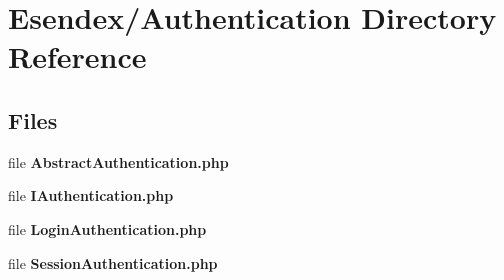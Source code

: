 \section{Esendex/\-Authentication Directory Reference}
\label{dir_8fef57e3d450ae2bdbdd65d9e7bc4335}
\subsection*{Files}
\begin{DoxyCompactItemize}
\item 
file {\bfseries Abstract\-Authentication.\-php}
\item 
file {\bfseries I\-Authentication.\-php}
\item 
file {\bfseries Login\-Authentication.\-php}
\item 
file {\bfseries Session\-Authentication.\-php}
\end{DoxyCompactItemize}
